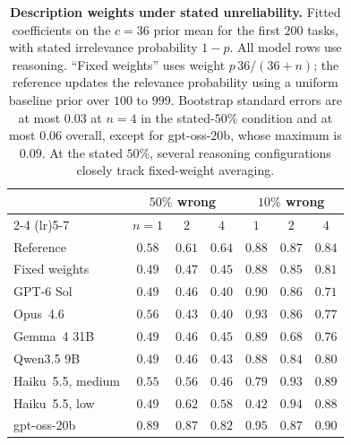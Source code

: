 \documentclass{article}
\theoremstyle{definition}
\begin{document}
\begin{table}[!htb]
\centering\small
\setlength{\tabcolsep}{3pt}
\caption{\textbf{Description weights under stated unreliability.} Fitted coefficients on the $c=36$ prior mean for the first $200$ tasks, with stated irrelevance probability $1-p$. All model rows use reasoning. ``Fixed weights'' uses weight $p\,36/(36+n)$; the reference updates the relevance probability using a uniform baseline prior over $100$ to $999$. Bootstrap standard errors are at most $0.03$ at $n=4$ in the stated-$50\%$ condition and at most $0.06$ overall, except for gpt-oss-20b, whose maximum is $0.09$. At the stated $50\%$, several reasoning configurations closely track fixed-weight averaging.}
\label{tab:hedge}
\vspace{3pt}
\begin{tabular}{lcccccc}
\toprule
& \multicolumn{3}{c}{$50\%$ wrong} & \multicolumn{3}{c}{$10\%$ wrong} \\
\cmidrule(lr){2-4} \cmidrule(lr){5-7}
& $n=1$ & $2$ & $4$ & $1$ & $2$ & $4$ \\
\midrule
Reference & $0.58$ & $0.61$ & $0.64$ & $0.88$ & $0.87$ & $0.84$ \\
Fixed weights &$0.49$ & $0.47$ & $0.45$ & $0.88$ & $0.85$ & $0.81$ \\
\midrule
GPT-6 Sol & $0.49$ & $0.46$ & $0.40$ & $0.90$ & $0.86$ & $0.71$ \\
Opus~4.6 & $0.56$ & $0.43$ & $0.40$ & $0.93$ & $0.86$ & $0.77$ \\
Gemma~4 31B & $0.49$ & $0.46$ & $0.45$ & $0.89$ & $0.68$ & $0.76$ \\
Qwen3.5 9B & $0.49$ & $0.46$ & $0.43$ & $0.88$ & $0.84$ & $0.80$ \\
Haiku~5.5, medium & $0.55$ & $0.56$ & $0.46$ & $0.79$ & $0.93$ & $0.89$ \\
Haiku~5.5, low & $0.49$ & $0.62$ & $0.58$ & $0.42$ & $0.94$ & $0.88$ \\
gpt-oss-20b & $0.89$ & $0.87$ & $0.82$ & $0.95$ & $0.87$ & $0.90$ \\
\bottomrule
\end{tabular}
\end{table}
\end{document}
